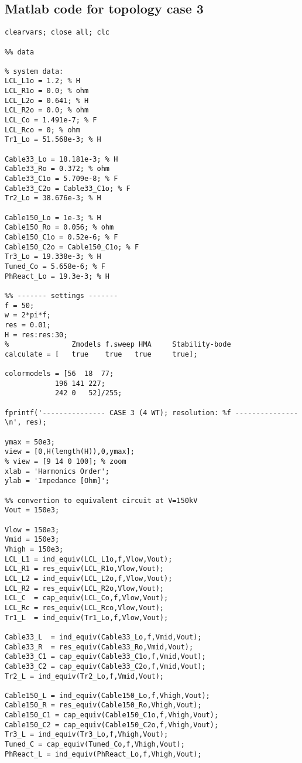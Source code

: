 \begin{appendices}
\chapter{Matlab code for topology case 3}
\renewcommand*{\thepage}{A\arabic{page}}
\begin{lstlisting}
clearvars; close all; clc

%% data

% system data:
LCL_L1o = 1.2; % H
LCL_R1o = 0.0; % ohm 
LCL_L2o = 0.641; % H
LCL_R2o = 0.0; % ohm 
LCL_Co = 1.491e-7; % F
LCL_Rco = 0; % ohm 
Tr1_Lo = 51.568e-3; % H 

Cable33_Lo = 18.181e-3; % H
Cable33_Ro = 0.372; % ohm
Cable33_C1o = 5.709e-8; % F
Cable33_C2o = Cable33_C1o; % F
Tr2_Lo = 38.676e-3; % H

Cable150_Lo = 1e-3; % H
Cable150_Ro = 0.056; % ohm
Cable150_C1o = 0.52e-6; % F
Cable150_C2o = Cable150_C1o; % F
Tr3_Lo = 19.338e-3; % H
Tuned_Co = 5.658e-6; % F
PhReact_Lo = 19.3e-3; % H

%% ------- settings -------
f = 50;
w = 2*pi*f;
res = 0.01;
H = res:res:30;
%               Zmodels f.sweep HMA     Stability-bode
calculate = [   true    true   true     true];

colormodels = [56  18  77;
            196 141 227;
            242 0   52]/255;

fprintf('--------------- CASE 3 (4 WT); resolution: %f --------------- \n', res);

ymax = 50e3;
view = [0,H(length(H)),0,ymax];
% view = [9 14 0 100]; % zoom
xlab = 'Harmonics Order';
ylab = 'Impedance [Ohm]';

%% convertion to equivalent circuit at V=150kV
Vout = 150e3;

Vlow = 150e3;
Vmid = 150e3;
Vhigh = 150e3;
LCL_L1 = ind_equiv(LCL_L1o,f,Vlow,Vout);
LCL_R1 = res_equiv(LCL_R1o,Vlow,Vout);
LCL_L2 = ind_equiv(LCL_L2o,f,Vlow,Vout);
LCL_R2 = res_equiv(LCL_R2o,Vlow,Vout);
LCL_C  = cap_equiv(LCL_Co,f,Vlow,Vout);
LCL_Rc = res_equiv(LCL_Rco,Vlow,Vout);
Tr1_L  = ind_equiv(Tr1_Lo,f,Vlow,Vout);

Cable33_L  = ind_equiv(Cable33_Lo,f,Vmid,Vout);
Cable33_R  = res_equiv(Cable33_Ro,Vmid,Vout);
Cable33_C1 = cap_equiv(Cable33_C1o,f,Vmid,Vout);
Cable33_C2 = cap_equiv(Cable33_C2o,f,Vmid,Vout);
Tr2_L = ind_equiv(Tr2_Lo,f,Vmid,Vout);

Cable150_L = ind_equiv(Cable150_Lo,f,Vhigh,Vout);
Cable150_R = res_equiv(Cable150_Ro,Vhigh,Vout);
Cable150_C1 = cap_equiv(Cable150_C1o,f,Vhigh,Vout);
Cable150_C2 = cap_equiv(Cable150_C2o,f,Vhigh,Vout);
Tr3_L = ind_equiv(Tr3_Lo,f,Vhigh,Vout);
Tuned_C = cap_equiv(Tuned_Co,f,Vhigh,Vout);
PhReact_L = ind_equiv(PhReact_Lo,f,Vhigh,Vout);


\end{lstlisting}
\end{appendices}
